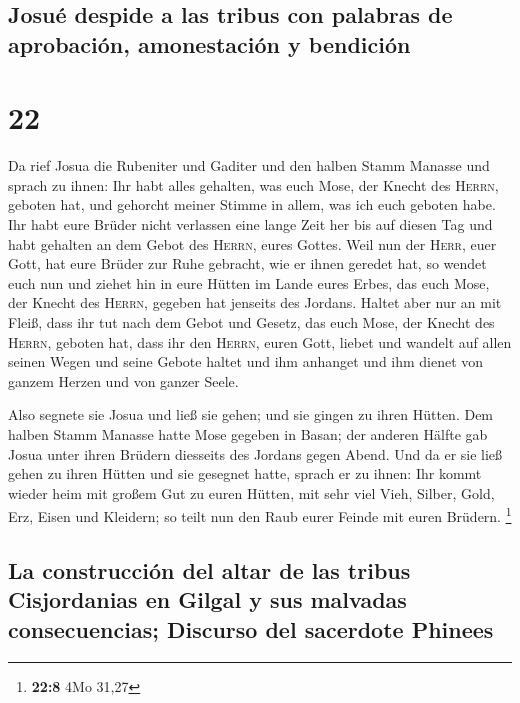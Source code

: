 \hypertarget{josuuxe9-despide-a-las-tribus-con-palabras-de-aprobaciuxf3n-amonestaciuxf3n-y-bendiciuxf3n}{%
\subsection{Josué despide a las tribus con palabras de aprobación,
amonestación y
bendición}\label{josuuxe9-despide-a-las-tribus-con-palabras-de-aprobaciuxf3n-amonestaciuxf3n-y-bendiciuxf3n}}

\hypertarget{section-21}{%
\section{22}\label{section-21}}

 Da rief Josua die Rubeniter und Gaditer und den halben
Stamm Manasse  und sprach zu ihnen: Ihr habt alles
gehalten, was euch Mose, der Knecht des \textsc{Herrn}, geboten hat, und
gehorcht meiner Stimme in allem, was ich euch geboten habe.
 Ihr habt eure Brüder nicht verlassen eine lange Zeit her
bis auf diesen Tag und habt gehalten an dem Gebot des \textsc{Herrn},
eures Gottes.  Weil nun der \textsc{Herr}, euer Gott, hat
eure Brüder zur Ruhe gebracht, wie er ihnen geredet hat, so wendet euch
nun und ziehet hin in eure Hütten im Lande eures Erbes, das euch Mose,
der Knecht des \textsc{Herrn}, gegeben hat jenseits des Jordans.
 Haltet aber nur an mit Fleiß, dass ihr tut nach dem Gebot
und Gesetz, das euch Mose, der Knecht des \textsc{Herrn}, geboten hat,
dass ihr den \textsc{Herrn}, euren Gott, liebet und wandelt auf allen
seinen Wegen und seine Gebote haltet und ihm anhanget und ihm dienet von
ganzem Herzen und von ganzer Seele.

 Also segnete sie Josua und ließ sie gehen; und sie gingen
zu ihren Hütten.  Dem halben Stamm Manasse hatte Mose
gegeben in Basan; der anderen Hälfte gab Josua unter ihren Brüdern
diesseits des Jordans gegen Abend. Und da er sie ließ gehen zu ihren
Hütten und sie gesegnet hatte,  sprach er zu ihnen: Ihr
kommt wieder heim mit großem Gut zu euren Hütten, mit sehr viel Vieh,
Silber, Gold, Erz, Eisen und Kleidern; so teilt nun den Raub eurer
Feinde mit euren Brüdern. \footnote{\textbf{22:8} 4Mo 31,27}

\hypertarget{la-construcciuxf3n-del-altar-de-las-tribus-cisjordanias-en-gilgal-y-sus-malvadas-consecuencias-discurso-del-sacerdote-phinees}{%
\subsection{La construcción del altar de las tribus Cisjordanias en
Gilgal y sus malvadas consecuencias; Discurso del sacerdote
Phinees}\label{la-construcciuxf3n-del-altar-de-las-tribus-cisjordanias-en-gilgal-y-sus-malvadas-consecuencias-discurso-del-sacerdote-phinees}}

